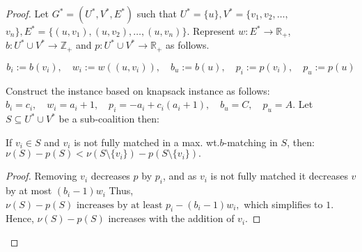 \begin{proof}








Let $G^*=(U^*,V^*,E^*)$ such that $U^*= \{u\} , V^*=\{v_1,v_2, \ldots,$ $ v_n\}, E^*= \{(u,v_1),(u,v_2), \dots, (u,v_n)\}$. Represent $w: E^* \rightarrow \mathbb{R}_+$, $b: U^*\cup V^* \rightarrow \mathbb{Z}_+$ and $p: U^*\cup V^* \rightarrow \mathbb{R}_+$ as follows.

$$b_i:= b(v_i), \quad w_i:= w((u,v_i)) ,   \quad b_u:=b(u) , \quad p_i:= p(v_i), \quad p_u:=p(u)$$

Construct the instance based on knapsack instance as follows:
$
b_i = c_i, \quad w_i = a_i + 1, \quad p_i = -a_i + c_i(a_i + 1),\quad b_u= C, \quad p_u= A.
$
Let $S \subseteq U^*\cup V^*$ be a sub-coalition then: 
\begin{lemma}
\label{lem:fully_matched_in_star}
If $ v_i \in S $ and $ v_i $ is not fully matched in a max. wt.$ b $-matching in $ S $, then:
$
\nu(S) - p(S) < \nu(S \setminus \{v_i\}) - p(S \setminus \{v_i\}).
$

\end{lemma}

\begin{proof}
Removing $ v_i $ decreases $ p $ by $ p_i $, and as $v_i$ is not fully matched it decreases $ v $ by at most $ (b_i - 1)w_i $ Thus,
$
\nu(S) - p(S) \text{ increases by at least } p_i - (b_i - 1)w_i,
$
which simplifies to $ 1 $. Hence, $ \nu(S) - p(S)$ increases with the addition of $v_i$.


\end{proof}
\end{proof}
